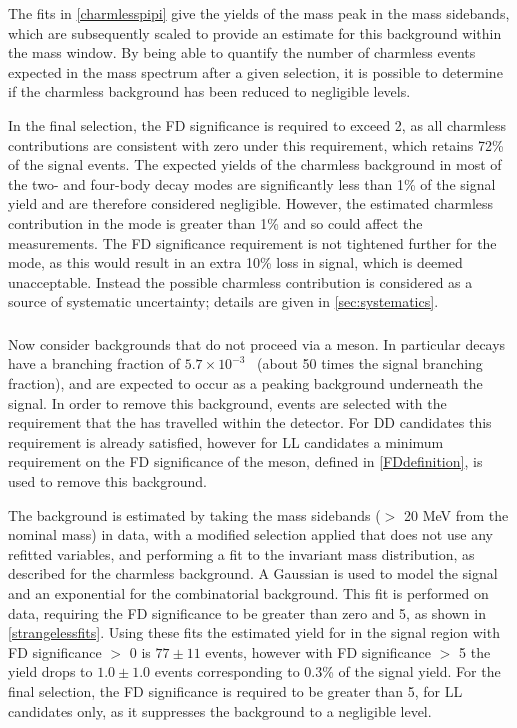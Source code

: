 The fits in \fig\ref{charmlesspipi} give the yields of the \Bm mass peak in the \Dz mass sidebands, which are subsequently scaled to provide an estimate for this background within the \Dz mass window. By being able to quantify the number of charmless events expected in the \Bm mass spectrum after a given selection, it is possible to determine if the charmless background has been reduced to negligible levels. 

In the final selection, the \Dz FD significance is required to exceed 2, as all charmless contributions are consistent with zero under this requirement, which retains 72\% of the signal events. The expected yields of the charmless background in most of the two- and four-body \Dz decay modes are significantly less than 1\% of the signal yield and are therefore considered negligible. However, the estimated charmless contribution in the \pipi mode is greater than 1\% and so could affect the measurements. The \Dz FD significance requirement is not tightened further for the \pipi mode, as this would result in an extra 10\% loss in signal, which is deemed unacceptable. Instead the possible charmless contribution is considered as a source of systematic uncertainty; details are given in \sect\ref{sec:systematics}. 

\subsubsection{\boldmath \decay{\Bm}{\D\pim\pip\pim}}
\label{sec:backgrounds:b2dpipipi}

Now consider backgrounds that do not proceed via a \KS meson. In particular \decay{\Bm}{\D\pim\pip\pim} decays have a branching fraction of $5.7 \times 10^{-3}$~\cite{PDG2014} (about 50 times the signal \decay{\Bm}{\D\Kstarm(\KS(\pip\pim)\pim)} branching fraction), and are expected to occur as a peaking background underneath the signal. In order to remove this background, events are selected with the requirement that the \KS has travelled within the detector. For DD candidates this requirement is already satisfied, however for LL candidates a minimum requirement on the FD significance of the \KS meson, defined in \eqn\ref{FDdefinition}, is used to remove this background. 

The \decay{\Bm}{\D\pim\pip\pim} background is estimated by taking the \KS mass sidebands ($>$ 20 MeV from the nominal \KS mass) in data, with a modified selection applied that does not use any refitted variables, and performing a fit to the invariant \Bm mass distribution, as described for the charmless background. A Gaussian is used to model the signal and an exponential for the combinatorial background. This fit is performed on \kpi data, requiring the \KS FD significance to be greater than zero and 5, as shown in \fig\ref{strangelessfits}. Using these fits the estimated \decay{\Bm}{\D\pim\pip\pim} yield for \runtwo in the signal region with \KS FD significance $>$ 0 is $77 \pm 11$ events, however with \KS FD significance $>$ 5 the yield drops to $1.0 \pm 1.0$ events corresponding to 0.3\% of the signal yield. For the final selection, the \KS FD significance is required to be greater than 5, for LL candidates only, as it suppresses the \decay{\Bm}{\D\pim\pip\pim} background to a negligible level.

